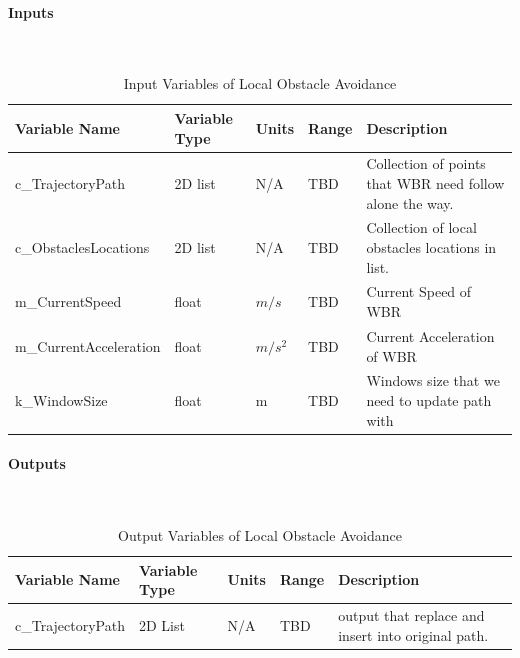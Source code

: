 \documentclass[12pt]{article}
\begin{document}
            \paragraph{Inputs}
                ~\newline
                \begin{table}[H]
                  \centering
                    \caption{Input Variables of Local Obstacle Avoidance} \label{tbl:Input Variables of Local Obstacle Avoidance}
                  \begin{tabularx}{\textwidth}{|p{5cm}|p{2cm}|p{1.2cm}|p{1cm}|X|}
                    \hline Variable Name & Variable Type & Units & Range & Description \\
                    \hline c\_TrajectoryPath & 2D list &  N/A & TBD & Collection of points that WBR need follow alone the way.\\
                    \hline c\_ObstaclesLocations & 2D list &  N/A & TBD & Collection of local obstacles locations in list.\\
                    \hline m\_CurrentSpeed  & float & $m/s$ & TBD & Current Speed of WBR\\
                    \hline m\_CurrentAcceleration & float & $m/s^2$ & TBD & Current Acceleration of WBR\\
                    \hline k\_WindowSize & float & m & TBD & Windows size that we need to update path with\\
                    \hline
                  \end{tabularx}
                \end{table} 
                
            \paragraph{Outputs}
                ~\newline
                \begin{table}[H]
                  \centering
                    \caption{Output Variables of Local Obstacle Avoidance} 
                    \label{tbl:Output Variables of Local Obstacle Avoidance}
                  \begin{tabularx}{\textwidth}{|p{5cm}|p{2cm}|p{1.2cm}|p{1cm}|X|}
                    \hline Variable Name & Variable Type & Units & Range & Description \\
                    \hline c\_TrajectoryPath & 2D List & N/A & TBD & output that replace and insert into original path.\\
                    \hline
                  \end{tabularx}
                \end{table} 
                
\end{document}
